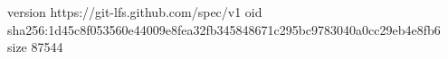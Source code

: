 version https://git-lfs.github.com/spec/v1
oid sha256:1d45c8f053560e44009e8fea32fb345848671c295bc9783040a0cc29eb4e8fb6
size 87544
